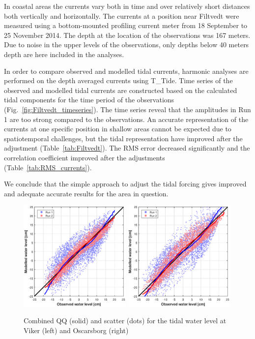 In coastal areas the currents vary both in time and over relatively short distances both vertically and horizontally. The currents at a position near Filtvedt were measured using a bottom-mounted profiling current meter from 18 September to 25 November 2014. The depth at the location of the observations was 167 meters. Due to noise in the upper levels of the observations, only depths below 40 meters depth are here included in the analyses. 

In order to compare observed and modelled tidal currents, harmonic analyses are performed on the depth averaged currents using T\_Tide.
Time series of the observed and modelled tidal currents are constructed based on the calculated tidal components for the time period of the observations (Fig.~\ref{fig:Filtvedt_timeseries}). The time series reveal that the amplitudes in Run 1 are too strong compared to the observations. 
An accurate representation of the currents at one specific position in shallow areas cannot be expected due to spatiotemporal challenges, but the tidal representation have improved after the adjustment (Table~\ref{tab:Filtvedt}). The RMS error decreased significantly and the correlation coefficient improved after the adjustments (Table~\ref{tab:RMS_currents}).

We conclude that the simple approach to adjust the tidal forcing gives improved and adequate accurate results for the area in question. 


\begin{figure}[!t]
\centering
\includegraphics[width=0.49\textwidth]{fig_Viker_QQ_Scatter}
\includegraphics[width=0.49\textwidth]{fig_Oscarsborg_QQ_Scatter}
\caption{Combined QQ (solid) and scatter (dots) for the tidal water level at Viker (left) and Oscarsborg (right)}
\label{fig:Oslo_QQ_Scatter}
\end{figure}

